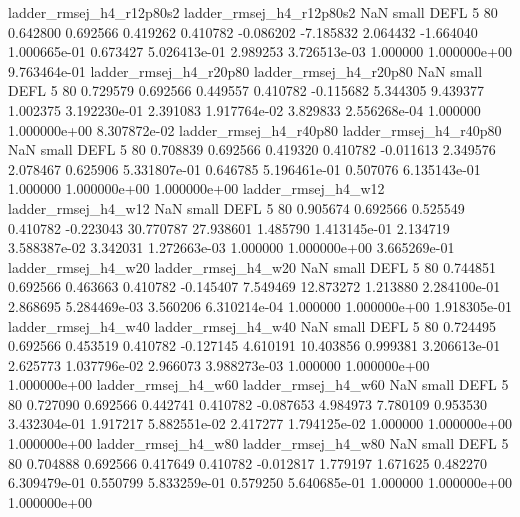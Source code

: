 ladder_rmsej_h4_r12p80s2 ladder_rmsej_h4_r12p80s2                   NaN      small     DEFL                 5 80 0.642800       0.692566 0.419262       0.410782   -0.086202     -7.185832      2.064432    -1.664040   1.000665e-01  0.673427 5.026413e-01     2.989253   3.726513e-03            1.000000    1.000000e+00        9.763464e-01
  ladder_rmsej_h4_r20p80   ladder_rmsej_h4_r20p80                   NaN      small     DEFL                 5 80 0.729579       0.692566 0.449557       0.410782   -0.115682      5.344305      9.439377     1.002375   3.192230e-01  2.391083 1.917764e-02     3.829833   2.556268e-04            1.000000    1.000000e+00        8.307872e-02
  ladder_rmsej_h4_r40p80   ladder_rmsej_h4_r40p80                   NaN      small     DEFL                 5 80 0.708839       0.692566 0.419320       0.410782   -0.011613      2.349576      2.078467     0.625906   5.331807e-01  0.646785 5.196461e-01     0.507076   6.135143e-01            1.000000    1.000000e+00        1.000000e+00
     ladder_rmsej_h4_w12      ladder_rmsej_h4_w12                   NaN      small     DEFL                 5 80 0.905674       0.692566 0.525549       0.410782   -0.223043     30.770787     27.938601     1.485790   1.413145e-01  2.134719 3.588387e-02     3.342031   1.272663e-03            1.000000    1.000000e+00        3.665269e-01
     ladder_rmsej_h4_w20      ladder_rmsej_h4_w20                   NaN      small     DEFL                 5 80 0.744851       0.692566 0.463663       0.410782   -0.145407      7.549469     12.873272     1.213880   2.284100e-01  2.868695 5.284469e-03     3.560206   6.310214e-04            1.000000    1.000000e+00        1.918305e-01
     ladder_rmsej_h4_w40      ladder_rmsej_h4_w40                   NaN      small     DEFL                 5 80 0.724495       0.692566 0.453519       0.410782   -0.127145      4.610191     10.403856     0.999381   3.206613e-01  2.625773 1.037796e-02     2.966073   3.988273e-03            1.000000    1.000000e+00        1.000000e+00
     ladder_rmsej_h4_w60      ladder_rmsej_h4_w60                   NaN      small     DEFL                 5 80 0.727090       0.692566 0.442741       0.410782   -0.087653      4.984973      7.780109     0.953530   3.432304e-01  1.917217 5.882551e-02     2.417277   1.794125e-02            1.000000    1.000000e+00        1.000000e+00
     ladder_rmsej_h4_w80      ladder_rmsej_h4_w80                   NaN      small     DEFL                 5 80 0.704888       0.692566 0.417649       0.410782   -0.012817      1.779197      1.671625     0.482270   6.309479e-01  0.550799 5.833259e-01     0.579250   5.640685e-01            1.000000    1.000000e+00        1.000000e+00
